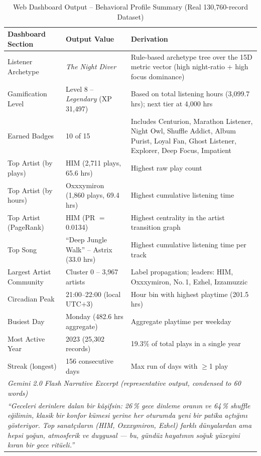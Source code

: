 \documentclass[conference]{IEEEtran}
\begin{document}
\begin{table}[ht]
\centering
\caption{Web Dashboard Output -- Behavioral Profile Summary (Real 130{,}760-record Dataset)}
\label{tab:dashboard}
\renewcommand{\arraystretch}{1.3}
\begin{tabular}{p{3.8cm} p{5.2cm} p{6.0cm}}
\toprule
\textbf{Dashboard Section} & \textbf{Output Value} & \textbf{Derivation} \\
\midrule
Listener Archetype          & \textit{The Night Diver}                       & Rule-based archetype tree over the 15D metric vector (high night-ratio + high focus dominance) \\
Gamification Level          & Level 8 -- \textit{Legendary} (XP 31{,}497) & Based on total listening hours (3{,}099.7 hrs); next tier at 4{,}000 hrs \\
Earned Badges               & 10 of 15                                       & Includes Centurion, Marathon Listener, Night Owl, Shuffle Addict, Album Purist, Loyal Fan, Ghost Listener, Explorer, Deep Focus, Impatient \\
Top Artist (by plays)       & HIM (2{,}711 plays, 65.6 hrs)                  & Highest raw play count \\
Top Artist (by hours)       & Oxxxymiron (1{,}860 plays, 69.4 hrs)           & Highest cumulative listening time \\
Top Artist (PageRank)       & HIM (PR $=$ 0.0134)                            & Highest centrality in the artist transition graph \\
Top Song                    & ``Deep Jungle Walk'' -- Astrix (33.0 hrs)      & Highest cumulative listening time per track \\
Largest Artist Community    & Cluster 0 -- 3{,}967 artists                   & Label propagation; leaders: HIM, Oxxxymiron, No.\,1, Ezhel, Izzamuzzic \\
Circadian Peak              & 21:00--22:00 (local UTC$+$3)                   & Hour bin with highest playtime (201.5 hrs) \\
Busiest Day                 & Monday (482.6 hrs aggregate)                   & Aggregate playtime per weekday \\
Most Active Year            & 2023 (25{,}302 records)                        & 19.3\% of total plays in a single year \\
Streak (longest)            & 156 consecutive days                            & Max run of days with $\geq$1 play \\
\midrule
\multicolumn{3}{l}{\textit{Gemini 2.0 Flash Narrative Excerpt (representative output, condensed to 60 words)}} \\
\multicolumn{3}{p{15.5cm}}{\small\textit{``Geceleri derinlere dalan bir kâşifsin: 26\,\% gece dinleme oranın ve 64\,\% shuffle eğilimin, klasik bir konfor kümesi yerine her oturumda yeni bir patika açtığını gösteriyor. Top sanatçıların \textnormal{(HIM, Oxxxymiron, Ezhel)} farklı dünyalardan ama hepsi yoğun, atmosferik ve duygusal --- bu, gündüz hayatının soğuk yüzeyini kıran bir gece ritüeli.''}} \\
\bottomrule
\end{tabular}
\end{table}
\end{document}
